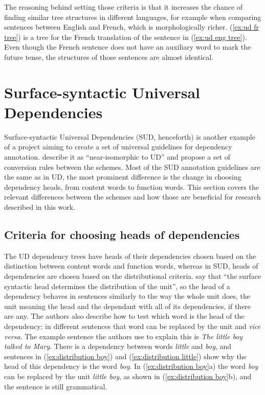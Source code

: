 The reasoning behind setting those criteria is that it increases the chance of finding similar tree structures in different languages, for example when comparing sentences between English and French, which is morphologically richer. (\ref{ex:ud fr tree}) is a tree for the French translation of the sentence in (\ref{ex:ud eng tree}). Even though the French sentence does not have an auxiliary word to mark the future tense, the structures of those sentences are almost identical.

\section{Surface-syntactic Universal Dependencies}\label{sec:sud}
Surface-syntactic Universal Dependencies (SUD, henceforth) is another example of a project aiming to create a set of universal guidelines for dependency annotation. \cite{gerdes-etal-2018-sud} describe it as ``near-isomorphic to UD'' and propose a set of conversion rules between the schemes. Most of the SUD annotation guidelines are the same as in UD, the most prominent difference is the change in choosing dependency heads, from content words to function words. This section covers the relevant differences between the schemes and how those are beneficial for research described in this work.

\subsection{Criteria for choosing heads of dependencies}\label{sec:sud criteria}
The UD dependency trees have heads of their dependencies chosen based on the distinction between content words and function words, whereas in SUD, heads of dependencies are chosen based on the distributional criteria. \cite{gerdes-etal-2018-sud} say that ``the surface syntactic head determines the distribution of the unit'', so the head of a dependency behaves in sentences similarly to the way the whole unit does, the unit meaning the head and the dependant with all of its dependencies, if there are any. The authors also describe how to test which word is the head of the dependency: in different sentences that word can be replaced by the unit and \textsl{vice versa}. The example sentence the authors use to explain this is \textsl{The little boy talked to Mary}. There is a dependency between words \textsl{little} and \textsl{boy}, and sentences in (\ref{ex:distribution boy}) and (\ref{ex:distribution little}) show why the head of this dependency is the word \textsl{boy}. In (\ref{ex:distribution boy}a) the word \textsl{boy} can be replaced by the unit \textsl{little boy}, as shown in (\ref{ex:distribution boy}b), and the sentence is still grammatical. 

